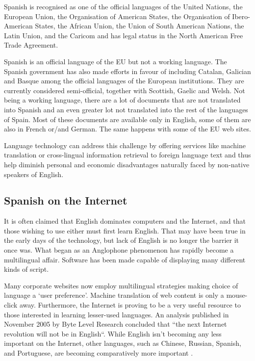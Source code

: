 \begin{multicols}{2}
Spanish is recognised as one of the official languages of the United Nations, the European Union, the Organisation of American States, the Organisation of Ibero-American States, the African Union, the Union of South American Nations, the Latin Union, and the Caricom and has legal status in the North American Free Trade Agreement.


Spanish is an official language of the EU but not a working language. The Spanish government has also made efforts in favour of including Catalan, Galician and Basque among the official languages of the European institutions. They are currently considered semi-official, together with Scottish, Gaelic and Welsh. Not being a working language, there are a lot of documents that are not translated into Spanish and an even greater lot not translated into the rest of the languages of Spain. Most of these documents are available only in English, some of them are also in French or/and German. The same happens with some of the EU web sites.

Language technology can address this challenge by offering services like machine translation or cross-lingual information retrieval to foreign language text and thus help diminish personal and economic disadvantages naturally faced by non-native speakers of English.


\subsection{Spanish on the Internet}

It is often claimed that English dominates computers and the Internet, and that those wishing to use either must first learn English. That may have been true in the early days of the technology, but lack of English is no longer the barrier it once was. What began as an Anglophone phenomenon has rapidly become a multilingual affair. Software has been made capable of displaying many different kinds of script. \cite{espanolred}


Many corporate websites now employ multilingual strategies making choice of language a ‘user preference’. Machine translation of web content is only a mouse-click away. Furthermore, the Internet is proving to be a very useful resource to those interested in learning lesser-used languages. An analysis published in November 2005 by Byte Level Research concluded that “the next Internet revolution will not be in English“. While English isn’t becoming any less important on the Internet, other languages, such as Chinese, Russian, Spanish, and Portuguese, are becoming comparatively more important \cite{britishcouncil}.


\end{multicols}
